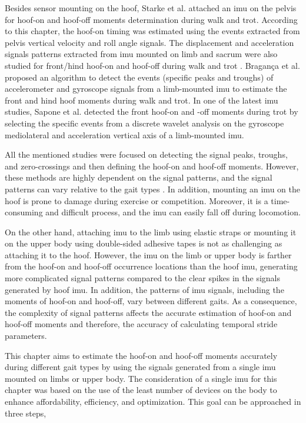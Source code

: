 Besides sensor mounting on the hoof, Starke et al. \cite{starke_2012_accuracy} attached an \gls{imu} on the pelvis for hoof-on and hoof-off moments determination during walk and trot. According to this chapter, the hoof-on timing was estimated using the events extracted from pelvis vertical velocity and roll angle signals. The displacement and acceleration signals patterns extracted from \gls{imu} mounted on limb and sacrum were also studied for front/hind hoof-on and hoof-off during walk and trot \cite{olsen_2012_accuracy}. Bragança et al. \cite{adsd1} proposed an algorithm to detect the events (specific peaks and troughs) of accelerometer and gyroscope signals from a limb-mounted \gls{imu} to estimate the front and hind hoof moments during walk and trot. In one of the latest \gls{imu} studies, Sapone et al. \cite{sapone_2020_comparison} detected the front hoof-on and -off moments during trot by selecting the specific events from a discrete wavelet analysis on the gyroscope mediolateral and acceleration vertical axis of a limb-mounted \gls{imu}. 

All the mentioned studies were focused on detecting the signal peaks, troughs, and zero-crossings and then defining the hoof-on and hoof-off moments. However, these methods are highly dependent on the signal patterns, and the signal patterns can vary relative to the gait types \cite{tijssen_2020_automatic, boye_2014_accuracy,ratzlaff_2005_relationships,sapone_2020_comparison}. In addition, mounting an \gls{imu} on the hoof is prone to damage during exercise or competition. Moreover, it is a time-consuming and difficult process, and the \gls{imu} can easily fall off during locomotion. 

On the other hand, attaching \gls{imu} to the limb using elastic straps or mounting it on the upper body using double-sided adhesive tapes is not as challenging as attaching it to the hoof. However, the \gls{imu} on the limb or upper body is farther from the hoof-on and hoof-off occurrence locations than the hoof \gls{imu}, generating more complicated signal patterns compared to the clear spikes in the signals generated by hoof \gls{imu}. In addition, the patterns of \gls{imu} signals, including the moments of hoof-on and hoof-off, vary between different gaits. As a consequence, the complexity of signal patterns affects the accurate estimation of hoof-on and hoof-off moments and therefore, the accuracy of calculating temporal stride parameters.

This chapter aims to estimate the hoof-on and hoof-off moments accurately during different gait types by using the signals generated from a single \gls{imu} mounted on limbs or upper body. The consideration of a single \gls{imu} for this chapter was based on the use of the least number of devices on the body to enhance affordability, efficiency, and optimization. This goal can be approached in three steps,

